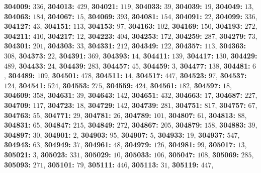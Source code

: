 \textsf{\bfseries 304009:} $336$, \textsf{\bfseries 304013:} $429$, \textsf{\bfseries 304021:} $119$, \textsf{\bfseries 304033:} $39$, \textsf{\bfseries 304039:} $19$, \textsf{\bfseries 304049:} $13$, \textsf{\bfseries 304063:} $184$, \textsf{\bfseries 304067:} $15$, \textsf{\bfseries 304069:} $393$, \textsf{\bfseries 304081:} $154$, \textsf{\bfseries 304091:} $22$, \textsf{\bfseries 304099:} $336$, \textsf{\bfseries 304127:} $43$, \textsf{\bfseries 304151:} $113$, \textsf{\bfseries 304153:} $97$, \textsf{\bfseries 304163:} $102$, \textsf{\bfseries 304169:} $150$, \textsf{\bfseries 304193:} $272$, \textsf{\bfseries 304211:} $410$, \textsf{\bfseries 304217:} $12$, \textsf{\bfseries 304223:} $404$, \textsf{\bfseries 304253:} $172$, \textsf{\bfseries 304259:} $287$, \textsf{\bfseries 304279:} $73$, \textsf{\bfseries 304301:} $201$, \textsf{\bfseries 304303:} $33$, \textsf{\bfseries 304331:} $212$, \textsf{\bfseries 304349:} $122$, \textsf{\bfseries 304357:} $113$, \textsf{\bfseries 304363:} $308$, \textsf{\bfseries 304373:} $22$, \textsf{\bfseries 304391:} $369$, \textsf{\bfseries 304393:} $14$, \textsf{\bfseries 304411:} $139$, \textsf{\bfseries 304417:} $130$, \textsf{\bfseries 304429:} $489$, \textsf{\bfseries 304433:} $24$, \textsf{\bfseries 304439:} $283$, \textsf{\bfseries 304457:} $45$, \textsf{\bfseries 304459:} $3$, \textsf{\bfseries 304477:} $138$, \textsf{\bfseries 304481:} $6$, \textsf{\bfseries 304489:} $109$, \textsf{\bfseries 304501:} $478$, \textsf{\bfseries 304511:} $14$, \textsf{\bfseries 304517:} $447$, \textsf{\bfseries 304523:} $97$, \textsf{\bfseries 304537:} $124$, \textsf{\bfseries 304541:} $524$, \textsf{\bfseries 304553:} $275$, \textsf{\bfseries 304559:} $424$, \textsf{\bfseries 304561:} $182$, \textsf{\bfseries 304597:} $18$, \textsf{\bfseries 304609:} $358$, \textsf{\bfseries 304631:} $39$, \textsf{\bfseries 304643:} $142$, \textsf{\bfseries 304651:} $432$, \textsf{\bfseries 304663:} $17$, \textsf{\bfseries 304687:} $227$, \textsf{\bfseries 304709:} $117$, \textsf{\bfseries 304723:} $18$, \textsf{\bfseries 304729:} $142$, \textsf{\bfseries 304739:} $281$, \textsf{\bfseries 304751:} $817$, \textsf{\bfseries 304757:} $67$, \textsf{\bfseries 304763:} $55$, \textsf{\bfseries 304771:} $29$, \textsf{\bfseries 304781:} $26$, \textsf{\bfseries 304789:} $101$, \textsf{\bfseries 304807:} $61$, \textsf{\bfseries 304813:} $88$, \textsf{\bfseries 304831:} $65$, \textsf{\bfseries 304847:} $215$, \textsf{\bfseries 304849:} $272$, \textsf{\bfseries 304867:} $205$, \textsf{\bfseries 304879:} $158$, \textsf{\bfseries 304883:} $39$, \textsf{\bfseries 304897:} $30$, \textsf{\bfseries 304901:} $2$, \textsf{\bfseries 304903:} $95$, \textsf{\bfseries 304907:} $5$, \textsf{\bfseries 304933:} $19$, \textsf{\bfseries 304937:} $547$, \textsf{\bfseries 304943:} $63$, \textsf{\bfseries 304949:} $37$, \textsf{\bfseries 304961:} $48$, \textsf{\bfseries 304979:} $126$, \textsf{\bfseries 304981:} $99$, \textsf{\bfseries 305017:} $13$, \textsf{\bfseries 305021:} $3$, \textsf{\bfseries 305023:} $331$, \textsf{\bfseries 305029:} $10$, \textsf{\bfseries 305033:} $106$, \textsf{\bfseries 305047:} $108$, \textsf{\bfseries 305069:} $285$, \textsf{\bfseries 305093:} $271$, \textsf{\bfseries 305101:} $79$, \textsf{\bfseries 305111:} $446$, \textsf{\bfseries 305113:} $31$, \textsf{\bfseries 305119:} $447$, 
